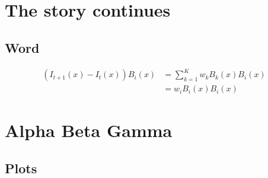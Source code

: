 \documentclass[]{ReportFormat}
\author{Krishna Toshniwal}
\date{\today}
\begin{document}
\thispagestyle{empty}
\maketitle

\setcounter{section}{-1}
\renewcommand\thesubsection{\thesection.\alph{subsection}}
\section{The story continues}

\subsection{Word}
\begin{align*}
(I_{t+1}(x)-I_t(x))B_i(x)&= \sum_{k=1}^K w_k B_k(x)  B_i(x)\\
&=w_i B_i(x)B_i(x)
\end{align*}

\renewcommand\thesubsection{\thesection.\arabic{subsection}}
\section{Alpha Beta Gamma}
\subsection{Plots}
\end{document}
